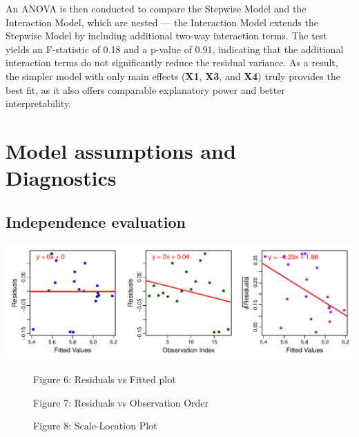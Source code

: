 \documentclass[
  12pt,
]{article}
\begin{document}
An ANOVA is then conducted to compare the Stepwise Model and the
Interaction Model, which are nested --- the Interaction Model extends
the Stepwise Model by including additional two-way interaction terms.
The test yields an F-statistic of 0.18 and a p-value of 0.91, indicating
that the additional interaction terms do not significantly reduce the
residual variance. As a result, the simpler model with only main effects
(\textbf{X1}, \textbf{X3}, and \textbf{X4}) truly provides the best fit,
as it also offers comparable explanatory power and better
interpretability.

\section{Model assumptions and
Diagnostics}\label{model-assumptions-and-diagnostics}

\subsection{Independence evaluation}\label{independence-evaluation}

\includegraphics{report1_r1_files/figure-latex/unnamed-chunk-11-1.pdf}

\begin{figure}[htbp]
\vspace{-1em}
  \centering
  \begin{minipage}[b]{0.3\linewidth}
    \centering
    {\fontsize{12}{14}\selectfont Figure 6: Residuals vs Fitted plot\par}
  \end{minipage}
  \hfill
  \begin{minipage}[b]{0.3\linewidth}
    \centering
    {\fontsize{12}{14}\selectfont Figure 7: Residuals vs Observation Order\par}
  \end{minipage}
  \hfill
  \begin{minipage}[b]{0.3\linewidth}
    \centering
    {\fontsize{12}{14}\selectfont Figure 8: Scale-Location Plot\par}
  \end{minipage}
\end{figure}
\end{document}
